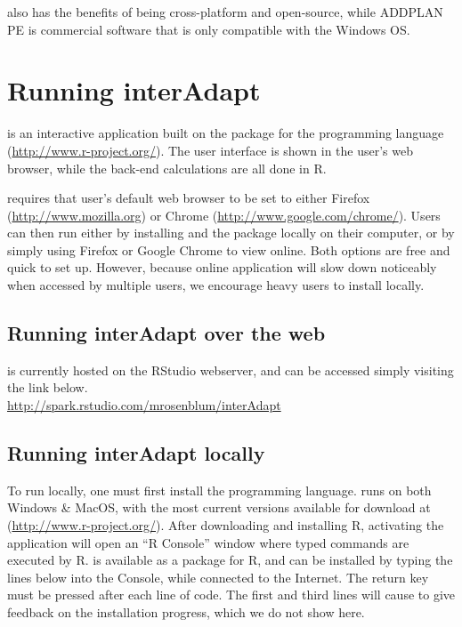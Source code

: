 \documentclass[article]{jss}
\begin{document}
 also has the benefits of being cross-platform and open-source, while ADDPLAN PE is commercial software that is only compatible with the Windows OS.

\section{Running interAdapt }%
\label{sec:running-interAdapt}

 is an interactive application built on the  package \citep{shiny2013manual} for the  programming language (\url{http://www.r-project.org/}). The user interface is shown in the user’s web browser, while the back-end calculations are all done in R. 

 requires that user's default web browser to be set to either Firefox (\url{http://www.mozilla.org}) or Chrome (\url{http://www.google.com/chrome/}). Users can then run  either by installing  and the   package locally on their computer, or by simply using Firefox or Google Chrome to view  online. Both options are free and quick to set up. However, because online application will slow down noticeably when accessed by multiple users, we encourage heavy users to install  locally.


\subsection{Running interAdapt over the web}
\label{sub:running-online}

 is currently hosted on the RStudio webserver, and can be accessed simply visiting the link below.\\
\url{http://spark.rstudio.com/mrosenblum/interAdapt}

\subsection{Running interAdapt locally}
\label{sub:running-locally}



To run  locally, one must first install the  programming language.  runs on both Windows \& MacOS, with the most current versions available for download at (\url{http://www.r-project.org/}). After downloading and installing R, activating the  application will open an ``R Console'' window where typed commands are executed by R.  is available as a package for R, and can be installed by typing the lines below into the  Console, while connected to the Internet. The return key must be pressed after each line of code. The first and third lines will cause  to give feedback on the installation progress, which we do not show here.
\end{document}
